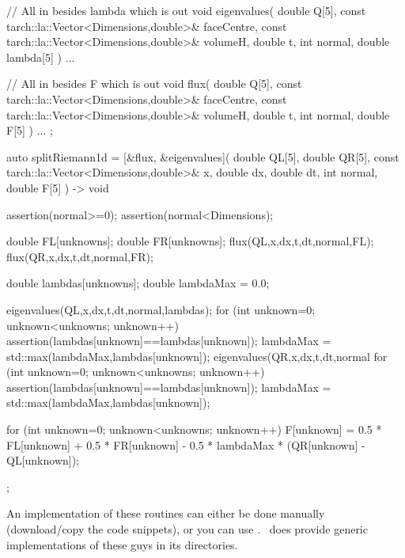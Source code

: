 \begin{code}
// All in besides lambda which is out
void eigenvalues(
  double                                       Q[5],
  const tarch::la::Vector<Dimensions,double>&  faceCentre,
  const tarch::la::Vector<Dimensions,double>&  volumeH,
  double                                       t,
  int                                          normal,
  double                                       lambda[5]
) {
  ...
}


// All in besides F which is out
void flux(
  double                                       Q[5],
  const tarch::la::Vector<Dimensions,double>&  faceCentre,
  const tarch::la::Vector<Dimensions,double>&  volumeH,
  double                                       t,
  int                                          normal,
  double                                       F[5]
) {
  ...
};
\end{code}


\begin{code}
auto splitRiemann1d = [&flux, &eigenvalues](
  double QL[5], double QR[5], const tarch::la::Vector<Dimensions,double>& x,
  double dx, double dt, int normal, double F[5]
) -> void { 
  assertion(normal>=0);
  assertion(normal<Dimensions);

  double FL[unknowns];
  double FR[unknowns];
  flux(QL,x,dx,t,dt,normal,FL);
  flux(QR,x,dx,t,dt,normal,FR);

  double lambdas[unknowns];
  double lambdaMax = 0.0;

  eigenvalues(QL,x,dx,t,dt,normal,lambdas);
  for (int unknown=0; unknown<unknowns; unknown++) {
    assertion(lambdas[unknown]==lambdas[unknown]);
    lambdaMax = std::max(lambdaMax,lambdas[unknown]);
  }
  eigenvalues(QR,x,dx,t,dt,normal %
  for (int unknown=0; unknown<unknowns; unknown++) {
    assertion(lambdas[unknown]==lambdas[unknown]);
    lambdaMax = std::max(lambdaMax,lambdas[unknown]);
  }

  for (int unknown=0; unknown<unknowns; unknown++) {
    F[unknown] = 0.5 * FL[unknown] 
               + 0.5 * FR[unknown] 
               - 0.5 * lambdaMax * (QR[unknown] - QL[unknown]); }
};  
\end{code}

\begin{remark}
 An implementation of these routines can either be done manually (download/copy
 the code snippets), or you can use \ExaHyPE. \ExaHyPE\ does provide generic
 implementations of these guys in its directories.
\end{remark}

